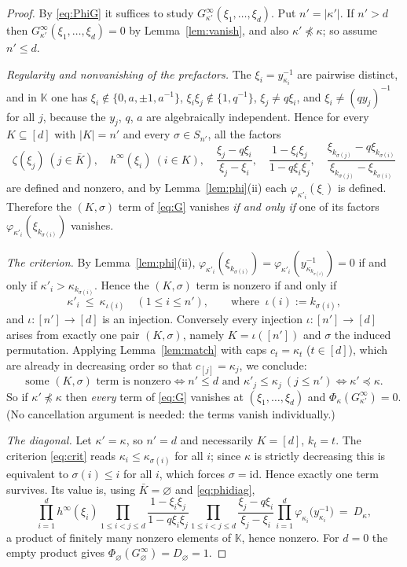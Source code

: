 \documentclass[11pt]{article}
\theoremstyle{definition}
\theoremstyle{remark}
\newcommand{\KK}{\mathbb{K}}
\newcommand{\Gi}[1]{G^{\infty}_{#1}}
\begin{document}
\begin{proof}
By \eqref{eq:PhiG} it suffices to study $\Gi{\kappa'}(\xi_1,\dots,\xi_d)$. Put $n'=|\kappa'|$.
If $n'>d$ then $\Gi{\kappa'}(\xi_1,\dots,\xi_d)=0$ by Lemma~\ref{lem:vanish}, and also
$\kappa'\not\preceq\kappa$; so assume $n'\le d$.

\emph{Regularity and nonvanishing of the prefactors.} The $\xi_i=y_{\kappa_i}^{-1}$ are
pairwise distinct, and in $\KK$ one has
$\xi_i\notin\{0,a,\pm1,a^{-1}\}$, $\xi_i\xi_j\notin\{1,q^{-1}\}$, $\xi_j\ne q\xi_i$, and
$\xi_i\ne(qy_j)^{-1}$ for all $j$, because the $y_j$, $q$, $a$ are algebraically independent.
Hence for every $K\subseteq[d]$ with $|K|=n'$ and every $\sigma\in S_{n'}$, all the factors
\[
  \zeta(\xi_j)\ (j\in\bar K),\quad h^\infty(\xi_i)\ (i\in K),\quad
  \frac{\xi_j-q\xi_i}{\xi_j-\xi_i},\quad \frac{1-\xi_i\xi_j}{1-q\xi_i\xi_j},\quad
  \frac{\xi_{k_{\sigma(j)}}-q\xi_{k_{\sigma(i)}}}{\xi_{k_{\sigma(j)}}-\xi_{k_{\sigma(i)}}}
\]
are defined and nonzero, and by Lemma~\ref{lem:phi}(ii) each $\varphi_{\kappa'_i}(\xi_{\cdot})$
is defined. Therefore the $(K,\sigma)$ term of \eqref{eq:G} vanishes \emph{if and only if} one
of its factors $\varphi_{\kappa'_i}(\xi_{k_{\sigma(i)}})$ vanishes.

\emph{The criterion.} By Lemma~\ref{lem:phi}(ii),
$\varphi_{\kappa'_i}(\xi_{k_{\sigma(i)}})=\varphi_{\kappa'_i}(y_{\kappa_{k_{\sigma(i)}}}^{-1})=0$
if and only if $\kappa'_i>\kappa_{k_{\sigma(i)}}$. Hence the $(K,\sigma)$ term is nonzero if and
only if
\begin{equation}\label{eq:crit}
  \kappa'_i\ \le\ \kappa_{\iota(i)}\quad (1\le i\le n'),
  \qquad\text{where }\ \iota(i):=k_{\sigma(i)} ,
\end{equation}
and $\iota:[n']\to[d]$ is an injection. Conversely every injection $\iota:[n']\to[d]$ arises
from exactly one pair $(K,\sigma)$, namely $K=\iota([n'])$ and $\sigma$ the induced
permutation. Applying Lemma~\ref{lem:match} with caps $c_t=\kappa_t$ ($t\in[d]$), which are
already in decreasing order so that $c_{[j]}=\kappa_j$, we conclude:
\[
  \text{some }(K,\sigma)\text{ term is nonzero}
  \iff n'\le d \text{ and } \kappa'_j\le\kappa_j\ (j\le n')
  \iff \kappa'\preceq\kappa .
\]
So if $\kappa'\not\preceq\kappa$ then \emph{every} term of \eqref{eq:G} vanishes at
$(\xi_1,\dots,\xi_d)$ and $\Phi_\kappa(\Gi{\kappa'})=0$. (No cancellation argument is needed:
the terms vanish individually.)

\emph{The diagonal.} Let $\kappa'=\kappa$, so $n'=d$ and necessarily $K=[d]$, $k_t=t$. The
criterion \eqref{eq:crit} reads $\kappa_i\le\kappa_{\sigma(i)}$ for all $i$; since $\kappa$ is
strictly decreasing this is equivalent to $\sigma(i)\le i$ for all $i$, which forces
$\sigma=\mathrm{id}$. Hence exactly one term survives. Its value is, using $\bar K=\varnothing$
and \eqref{eq:phidiag},
\[
  \prod_{i=1}^{d}h^\infty(\xi_i)
  \prod_{1\le i<j\le d}\frac{1-\xi_i\xi_j}{1-q\xi_i\xi_j}
  \prod_{1\le i<j\le d}\frac{\xi_j-q\xi_i}{\xi_j-\xi_i}
  \prod_{i=1}^{d}\varphi_{\kappa_i}\bigl(y_{\kappa_i}^{-1}\bigr)
  \ =\ D_\kappa ,
\]
a product of finitely many nonzero elements of $\KK$, hence nonzero. For $d=0$ the empty
product gives $\Phi_\varnothing(\Gi\varnothing)=D_\varnothing=1$.
\end{proof}
\end{document}
